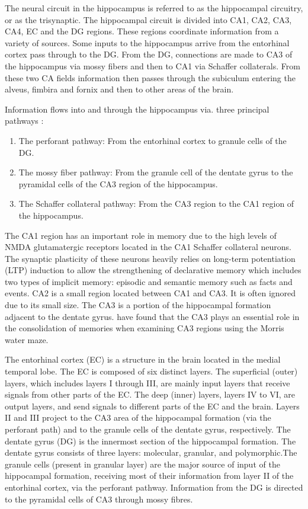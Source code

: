 ﻿\documentclass[12pt]{article}
\begin{document}
The neural circuit in the hippocampus is referred to as the
hippocampal circuitry, or as the trisynaptic. The hippocampal circuit
is divided into CA1, CA2, CA3, CA4, EC and the DG regions. These
regions coordinate information from a variety of sources. Some inputs
to the hippocampus arrive from the entorhinal cortex pass through to
the DG. From the DG, connections are made to CA3 of the hippocampus
via mossy fibers and then to CA1 via Schaffer collaterals. From these
two CA fields information then passes through the subiculum entering
the alveus, fimbira and fornix and then to other areas of the brain.

Information flows into and through the hippocampus via. three
principal pathways \cite{limbicsystem:hippocampus}:

\begin{enumerate}
  \item The perforant pathway: From the entorhinal cortex to granule
    cells of the DG.

  \item The mossy fiber pathway: From the granule cell of the dentate
    gyrus to the pyramidal cells of the CA3 region of the hippocampus.

  \item The Schaffer collateral pathway: From the CA3 region to the
    CA1 region of the hippocampus.

\end{enumerate}

The CA1 region has an important role in memory due to the high levels
of NMDA glutamatergic receptors located in the CA1 Schaffer collateral
neurons. The synaptic plasticity of these neurons heavily relies on
long-term potentiation (LTP) induction to allow the strengthening of
declarative memory which includes two types of implicit memory:
episodic and semantic memory such as facts and events. CA2 is a small
region located between CA1 and CA3. It is often ignored due to its
small size. The CA3 is a portion of the hippocampal formation adjacent
to the dentate gyrus. \textcite{hippocampalca3} have found that the
CA3 plays an essential role in the consolidation of memories when
examining CA3 regions using the Morris water maze.

The entorhinal cortex (EC) is a structure in the brain located in the
medial temporal lobe. The EC is composed of six distinct layers. The
superficial (outer) layers, which includes layers I through III, are
mainly input layers that receive signals from other parts of the
EC. The deep (inner) layers, layers IV to VI, are output layers, and
send signals to different parts of the EC and the brain. Layers II and
III project to the CA3 area of the hippocampal formation (via the
perforant path) and to the granule cells of the dentate gyrus,
respectively. The dentate gyrus (DG) is the innermost section of the
hippocampal formation. The dentate gyrus consists of three layers:
molecular, granular, and polymorphic.The granule cells (present in
granular layer) are the major source of input of the hippocampal
formation, receiving most of their information from layer II of the
entorhinal cortex, via the perforant pathway. Information from the DG
is directed to the pyramidal cells of CA3 through mossy fibres.
\end{document}
